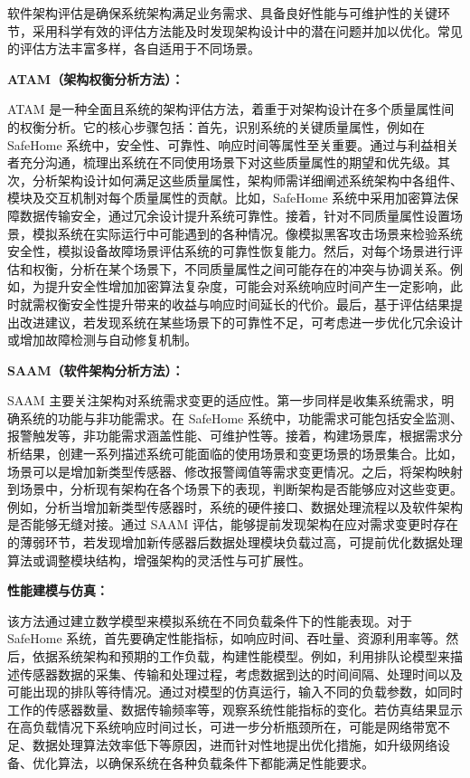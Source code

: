 软件架构评估是确保系统架构满足业务需求、具备良好性能与可维护性的关键环节，采用科学有效的评估方法能及时发现架构设计中的潜在问题并加以优化。常见的评估方法丰富多样，各自适用于不同场景。

\textbf{ATAM（架构权衡分析方法）：}

ATAM 是一种全面且系统的架构评估方法，着重于对架构设计在多个质量属性间的权衡分析。它的核心步骤包括：首先，识别系统的关键质量属性，例如在 SafeHome 系统中，安全性、可靠性、响应时间等属性至关重要。通过与利益相关者充分沟通，梳理出系统在不同使用场景下对这些质量属性的期望和优先级。其次，分析架构设计如何满足这些质量属性，架构师需详细阐述系统架构中各组件、模块及交互机制对每个质量属性的贡献。比如，SafeHome 系统中采用加密算法保障数据传输安全，通过冗余设计提升系统可靠性。接着，针对不同质量属性设置场景，模拟系统在实际运行中可能遇到的各种情况。像模拟黑客攻击场景来检验系统安全性，模拟设备故障场景评估系统的可靠性恢复能力。然后，对每个场景进行评估和权衡，分析在某个场景下，不同质量属性之间可能存在的冲突与协调关系。例如，为提升安全性增加加密算法复杂度，可能会对系统响应时间产生一定影响，此时就需权衡安全性提升带来的收益与响应时间延长的代价。最后，基于评估结果提出改进建议，若发现系统在某些场景下的可靠性不足，可考虑进一步优化冗余设计或增加故障检测与自动修复机制。

\textbf{SAAM（软件架构分析方法）：}

SAAM 主要关注架构对系统需求变更的适应性。第一步同样是收集系统需求，明确系统的功能与非功能需求。在 SafeHome 系统中，功能需求可能包括安全监测、报警触发等，非功能需求涵盖性能、可维护性等。接着，构建场景库，根据需求分析结果，创建一系列描述系统可能面临的使用场景和变更场景的场景集合。比如，场景可以是增加新类型传感器、修改报警阈值等需求变更情况。之后，将架构映射到场景中，分析现有架构在各个场景下的表现，判断架构是否能够应对这些变更。例如，分析当增加新类型传感器时，系统的硬件接口、数据处理流程以及软件架构是否能够无缝对接。通过 SAAM 评估，能够提前发现架构在应对需求变更时存在的薄弱环节，若发现增加新传感器后数据处理模块负载过高，可提前优化数据处理算法或调整模块结构，增强架构的灵活性与可扩展性。

\textbf{性能建模与仿真：}

该方法通过建立数学模型来模拟系统在不同负载条件下的性能表现。对于 SafeHome 系统，首先要确定性能指标，如响应时间、吞吐量、资源利用率等。然后，依据系统架构和预期的工作负载，构建性能模型。例如，利用排队论模型来描述传感器数据的采集、传输和处理过程，考虑数据到达的时间间隔、处理时间以及可能出现的排队等待情况。通过对模型的仿真运行，输入不同的负载参数，如同时工作的传感器数量、数据传输频率等，观察系统性能指标的变化。若仿真结果显示在高负载情况下系统响应时间过长，可进一步分析瓶颈所在，可能是网络带宽不足、数据处理算法效率低下等原因，进而针对性地提出优化措施，如升级网络设备、优化算法，以确保系统在各种负载条件下都能满足性能要求。

